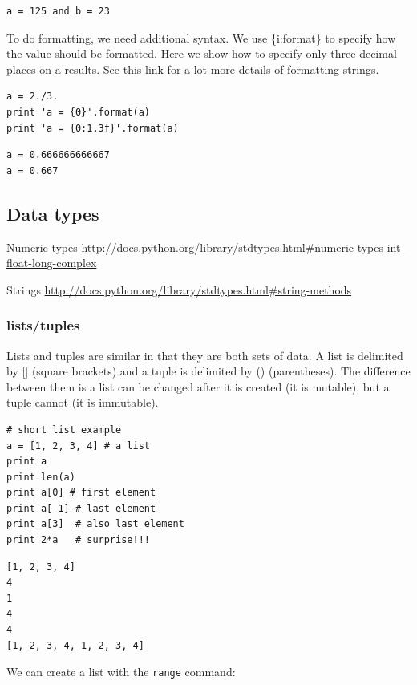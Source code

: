 \documentclass[11pt]{article}
\begin{document}
\begin{verbatim}
a = 125 and b = 23
\end{verbatim}

To do formatting, we need additional syntax. We use \{i:format\} to specify how the value should be formatted. Here we show how to specify only three decimal places on a results. See \href{http://docs.python.org/library/stdtypes.html#string-formatting-operations}{this link} for a lot more details of formatting strings.
\begin{verbatim}
a = 2./3.
print 'a = {0}'.format(a)
print 'a = {0:1.3f}'.format(a)
\end{verbatim}

\begin{verbatim}
a = 0.666666666667
a = 0.667
\end{verbatim}


\subsection{Data types}
\label{sec-3-3}
Numeric types \url{http://docs.python.org/library/stdtypes.html#numeric-types-int-float-long-complex}

Strings \url{http://docs.python.org/library/stdtypes.html#string-methods}


\subsubsection{lists/tuples}
\label{sec-3-3-1}

Lists and tuples are similar in that they are both sets of data. A list is delimited by [] (square brackets) and a tuple is delimited by () (parentheses). The difference between them is a list can be changed after it is created (it is mutable), but a tuple cannot (it is immutable).

\begin{verbatim}
# short list example
a = [1, 2, 3, 4] # a list
print a
print len(a)
print a[0] # first element
print a[-1] # last element
print a[3]  # also last element
print 2*a   # surprise!!!
\end{verbatim}

\begin{verbatim}
[1, 2, 3, 4]
4
1
4
4
[1, 2, 3, 4, 1, 2, 3, 4]
\end{verbatim}

We can create a list with the \texttt{range} command:
\end{document}
